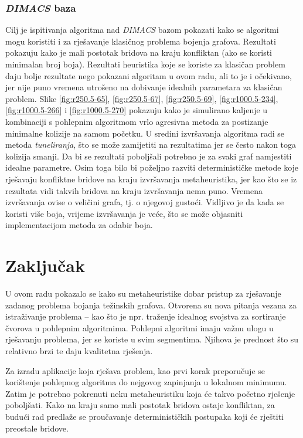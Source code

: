 \documentclass[times, utf8, diplomski, numeric]{fer}
\begin{document}
\subsection{\emph{DIMACS} baza}

Cilj je ispitivanja algoritma nad \emph{DIMACS} bazom pokazati kako se algoritmi mogu koristiti i za rješavanje klasičnog problema bojenja grafova. Rezultati pokazuju kako je mali postotak bridova na kraju konfliktan (ako se koristi minimalan broj boja). Rezultati heuristika koje se koriste za klasičan problem daju bolje rezultate nego pokazani algoritam u ovom radu, ali to je i očekivano, jer nije puno vremena utrošeno na dobivanje idealnih parametara za klasičan problem. Slike \ref{fig:r250.5-65}, \ref{fig:r250.5-67}, \ref{fig:r250.5-69}, \ref{fig:r1000.5-234}, \ref{fig:r1000.5-266} i \ref{fig:r1000.5-270} pokazuju kako je simulirano kaljenje u kombinaciji s pohlepnim algoritmom vrlo agresivna metoda za postizanje minimalne kolizije na samom početku. U sredini izvršavanja algoritma radi se metoda \emph{tuneliranja}, što se može zamijetiti na rezultatima jer se često nakon toga kolizija smanji. Da bi se rezultati poboljšali potrebno je za svaki graf namjestiti idealne parametre. Osim toga bilo bi poželjno razviti determinističke metode koje rješavaju konfliktne bridove na kraju izvršavanja metaheuristika, jer kao što se iz rezultata vidi takvih bridova na kraju izvršavanja nema puno. Vremena izvršavanja ovise o veličini grafa, tj. o njegovoj gustoći. Vidljivo je da kada se koristi više boja, vrijeme izvršavanja je veće, što se može objasniti implementacijom metoda za odabir boja.

\chapter{Zaključak}

U ovom radu pokazalo se kako su metaheuristike dobar pristup za rješavanje zadanog problema bojanja težinskih grafova. Otvorena su nova pitanja vezana za istraživanje problema -- kao što je npr. traženje idealnog svojstva za sortiranje čvorova u pohlepnim algoritmima. Pohlepni algoritmi imaju važnu ulogu u rješavanju problema, jer se koriste u svim segmentima. Njihova je prednost što su relativno brzi te daju kvalitetna rješenja.

Za izradu aplikacije koja rješava problem, kao prvi korak preporučuje se korištenje pohlepnog algoritma do nejgovog zapinjanja u lokalnom minimumu. Zatim je potrebno pokrenuti neku metaheuristiku koja će takvo početno rješenje poboljšati. Kako na kraju samo mali postotak bridova ostaje konfliktan, za budući rad predlaže se proučavanje determinističkih postupaka koji će rještiti preostale bridove.
\end{document}

